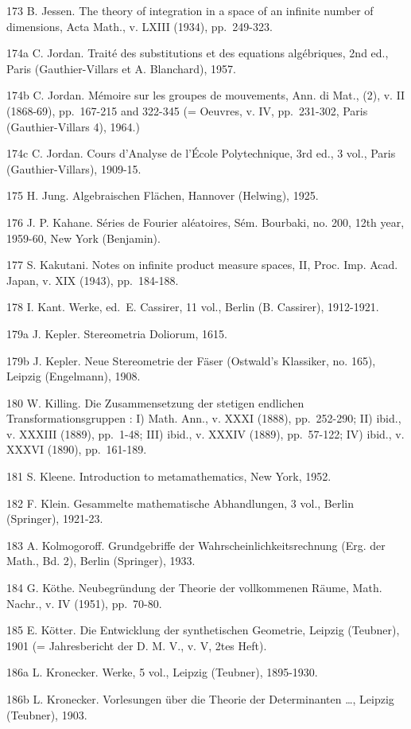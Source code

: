 173 B. Jessen. The theory of integration in a space of an infinite number of dimensions, Acta Math., v. LXIII (1934), pp.~249-323.

174a C. Jordan. Traité des substitutions et des equations algébriques, 2nd ed., Paris (Gauthier-Villars et A. Blanchard), 1957.

174b C. Jordan. Mémoire sur les groupes de mouvements, Ann. di Mat., (2), v. II (1868-69), pp.~167-215 and 322-345 (= Oeuvres, v. IV, pp.~231-302, Paris (Gauthier-Villars 4), 1964.)

174c C. Jordan. Cours d'Analyse de l'École Polytechnique, 3rd ed., 3 vol., Paris (Gauthier-Villars), 1909-15.

175 H. Jung. Algebraischen Flächen, Hannover (Helwing), 1925.

176 J. P. Kahane. Séries de Fourier aléatoires, Sém. Bourbaki, no. 200, 12th year, 1959-60, New York (Benjamin).

177 S. Kakutani. Notes on infinite product measure spaces, II, Proc. Imp. Acad. Japan, v. XIX (1943), pp.~184-188.

178 I. Kant. Werke, ed.~E. Cassirer, 11 vol., Berlin (B. Cassirer), 1912-1921.

179a J. Kepler. Stereometria Doliorum, 1615.

179b J. Kepler. Neue Stereometrie der Fäser (Ostwald's Klassiker, no. 165), Leipzig (Engelmann), 1908.

180 W. Killing. Die Zusammensetzung der stetigen endlichen Transformationsgruppen : I) Math. Ann., v. XXXI (1888), pp.~252-290; II) ibid., v. XXXIII (1889), pp.~1-48; III) ibid., v. XXXIV (1889), pp.~57-122; IV) ibid., v. XXXVI (1890), pp.~161-189.

181 S. Kleene. Introduction to metamathematics, New York, 1952.

182 F. Klein. Gesammelte mathematische Abhandlungen, 3 vol., Berlin (Springer), 1921-23.

183 A. Kolmogoroff. Grundgebriffe der Wahrscheinlichkeitsrechnung (Erg. der Math., Bd. 2), Berlin (Springer), 1933.

184 G. Köthe. Neubegründung der Theorie der vollkommenen Räume, Math. Nachr., v. IV (1951), pp.~70-80.

185 E. Kötter. Die Entwicklung der synthetischen Geometrie, Leipzig (Teubner), 1901 (= Jahresbericht der D. M. V., v. V, 2tes Heft).

186a L. Kronecker. Werke, 5 vol., Leipzig (Teubner), 1895-1930.

186b L. Kronecker. Vorlesungen über die Theorie der Determinanten \ldots, Leipzig (Teubner), 1903.

